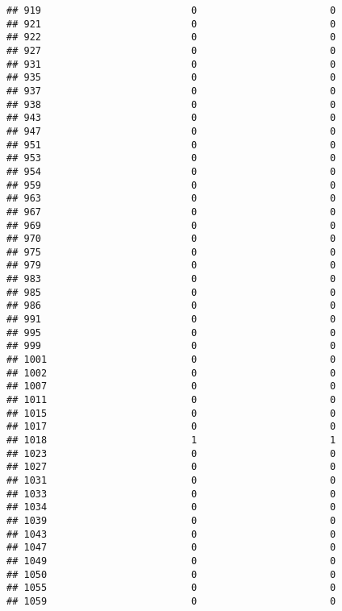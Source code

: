 \documentclass[
]{article}
\begin{document}
\begin{verbatim}
## 919                          0                       0
## 921                          0                       0
## 922                          0                       0
## 927                          0                       0
## 931                          0                       0
## 935                          0                       0
## 937                          0                       0
## 938                          0                       0
## 943                          0                       0
## 947                          0                       0
## 951                          0                       0
## 953                          0                       0
## 954                          0                       0
## 959                          0                       0
## 963                          0                       0
## 967                          0                       0
## 969                          0                       0
## 970                          0                       0
## 975                          0                       0
## 979                          0                       0
## 983                          0                       0
## 985                          0                       0
## 986                          0                       0
## 991                          0                       0
## 995                          0                       0
## 999                          0                       0
## 1001                         0                       0
## 1002                         0                       0
## 1007                         0                       0
## 1011                         0                       0
## 1015                         0                       0
## 1017                         0                       0
## 1018                         1                       1
## 1023                         0                       0
## 1027                         0                       0
## 1031                         0                       0
## 1033                         0                       0
## 1034                         0                       0
## 1039                         0                       0
## 1043                         0                       0
## 1047                         0                       0
## 1049                         0                       0
## 1050                         0                       0
## 1055                         0                       0
## 1059                         0                       0

\end{verbatim}
\end{document}
